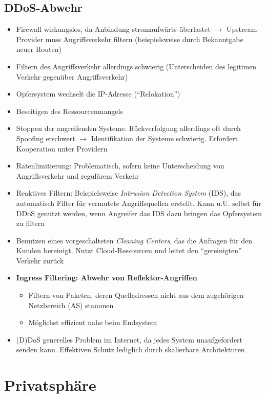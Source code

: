 \subsection{DDoS-Abwehr}
	\begin{itemize}
		\item Firewall wirkungslos, da Anbindung stromaufwärts überlastet \(\rightarrow\) Upstream-Provider muss Angriffsverkehr filtern (beispielsweise durch Bekanntgabe neuer Routen)
		\item Filtern des Angriffsverkehr allerdings schwierig (Unterscheiden des legitimen Verkehr gegenüber Angriffsverkehr)
		\item Opfersystem wechselt die IP-Adresse ("`Relokation"')
		\item Beseitigen des Ressourcenmangels
		\item Stoppen der angreifenden Systeme. Rückverfolgung allerdings oft durch Spoofing erschwert \(\rightarrow\) Identifikation der Systeme schwierig. Erfordert Kooperation unter Providern
		\item Ratenlimitierung: Problematisch, sofern keine Unterscheidung von Angriffsverkehr und regulärem Verkehr
		\item Reaktives Filtern: Beispielsweise \textit{Intrusion Detection System} (IDS), das automatisch Filter für vermutete Angriffsquellen erstellt. Kann u.U. selbst für DDoS genutzt werden, wenn Angreifer das IDS dazu bringen das Opfersystem zu filtern
		\item Benutzen eines vorgeschalteten \textit{Cleaning Centers}, das die Anfragen für den Kunden bereinigt. Nutzt Cloud-Ressourcen und leitet den "`gereinigten"' Verkehr zurück
		\item \textbf{Ingress Filtering: Abwehr von Reflektor-Angriffen}
		\begin{itemize}
			\item Filtern von Paketen, deren Quelladressen nicht aus dem zugehörigen Netzbereich (AS) stammen
			\item Möglichst effizient nahe beim Endsystem
		\end{itemize}
		\item (D)DoS generelles Problem im Internet, da jedes System unaufgefordert senden kann. Effektiven Schutz lediglich durch skalierbare Architekturen
\end{itemize}



\section{Privatsphäre}


